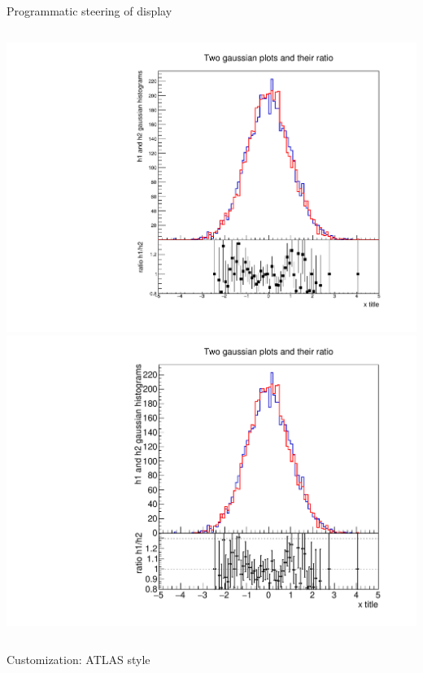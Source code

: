 \documentclass{beamer}
\begin{document}
\begin{frame}[t]{Programmatic steering of display}
  \begin{columns}
    \includegraphics[width=1.0\linewidth]{assets/oldratio.pdf}
    \includegraphics[width=1.0\linewidth]{assets/newratio.pdf}
  \end{columns}
\end{frame}

\begin{frame}[t]{Customization: ATLAS style}
\end{frame}
\end{document}
